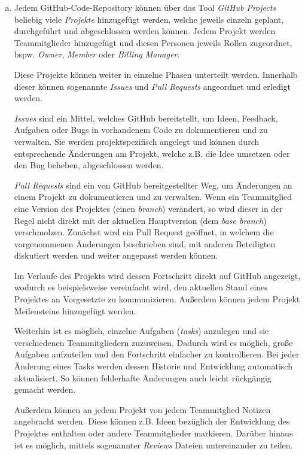 \begin{enumerate}[(a)]
	\item Jedem GitHub-Code-Repository können über das Tool \emph{GitHub Projects} beliebig viele \emph{Projekte} hinzugefügt werden, welche jeweils einzeln geplant, durchgeführt und abgeschlossen werden können. Jedem Projekt werden Teammitglieder hinzugefügt und diesen Personen jeweils Rollen zugeordnet, bspw. \emph{Owner}, \emph{Member} oder \emph{Billing Manager}.
	
	Diese Projekte können weiter in einzelne Phasen unterteilt werden. Innerhalb dieser können sogenannte \emph{Issues} und \emph{Pull Requests} angeordnet und erledigt werden.
	
	\emph{Issues} sind ein Mittel, welches GitHub bereitstellt, um Ideen, Feedback, Aufgaben oder Bugs in vorhandenem Code zu dokumentieren und zu verwalten. Sie werden projektspezifisch angelegt und können durch entsprechende Änderungen am Projekt, welche z.B. die Idee umsetzen oder den Bug beheben, abgeschlossen werden.
	
	\emph{Pull Requests} sind ein von GitHub bereitgestellter Weg, um Änderungen an einem Projekt zu dokumentieren und zu verwalten. Wenn ein Teammitglied eine Version des Projektes (einen \emph{branch}) verändert, so wird dieser in der Regel nicht direkt mit der aktuellen Hauptversion (dem \emph{base branch}) verschmolzen. Zunächst wird ein Pull Request geöffnet, in welchem die vorgenommenen Änderungen beschrieben sind, mit anderen Beteiligten diskutiert werden und weiter angepasst werden können.
	
	Im Verlaufe des Projekts wird dessen Fortschritt direkt auf GitHub angezeigt, wodurch es beispielsweise vereinfacht wird, den aktuellen Stand eines Projektes an Vorgesetzte zu kommunizieren. Außerdem können jedem Projekt Meilensteine hinzugefügt werden.
	
	Weiterhin ist es möglich, einzelne Aufgaben (\emph{tasks}) anzulegen und sie verschiedenen Teammitgliedern zuzuweisen. Dadurch wird es möglich, große Aufgaben aufzuteilen und den Fortschritt einfacher zu kontrollieren. Bei jeder Änderung eines Tasks werden dessen Historie und Entwicklung automatisch aktualisiert. So können fehlerhafte Änderungen auch leicht rückgängig gemacht werden.
	
	Außerdem können an jedem Projekt von jedem Teammitglied Notizen angebracht werden. Diese können z.B. Ideen bezüglich der Entwicklung des Projektes enthalten oder andere Teammitglieder markieren. Darüber hinaus ist es möglich, mittels sogenannter \emph{Reviews} Dateien untereinander zu teilen.
	

\end{enumerate}
